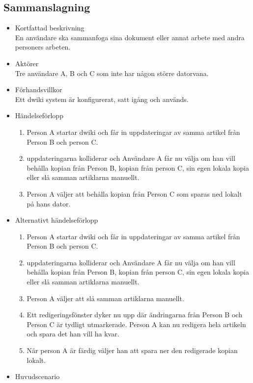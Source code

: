 \subsection{Sammanslagning}
\begin{itemize}
	\item Kortfattad beskrivning
	\\En användare ska sammanfoga sina dokument eller annat arbete med andra personers arbeten.
	\item Aktörer
	\\Tre användare A, B och C som inte har någon större datorvana.
	\item Förhandsvillkor
	\\Ett dwiki system är konfigurerat, satt igång och används.
	\item Händelseförlopp
	\begin{enumerate}
		\item Person A startar dwiki och får in uppdateringar av samma artikel från Person B och person C.
		\item uppdateringarna kolliderar och Användare A får nu välja om han vill behålla kopian från Person B, kopian från person C, sin egen lokala kopia eller slå samman artiklarna manuellt.
		\item Person A väljer att behålla kopian från Person C som sparas ned lokalt på hans dator.
	\end{enumerate}
	\item Alternativt händelseförlopp
	\begin{enumerate}	
		\item Person A startar dwiki och får in uppdateringar av samma artikel från Person B och person C.
		\item uppdateringarna kolliderar och Användare A får nu välja om han vill behålla kopian från Person B, kopian från person C, sin egen lokala kopia eller slå samman artiklarna manuellt.
		\item Person A väljer att slå samman artiklarna manuellt.
		\item Ett redigeringsfönster dyker nu upp där ändringarna från Person B och Person C är tydligt utmarkerade. Person A kan nu redigera hela artikeln och spara det han vill ha kvar.
		\item När person A är färdig väljer han att spara ner den redigerade kopian lokalt.
	\end{enumerate}	
	\item Huvudscenario
	

\end{itemize}
